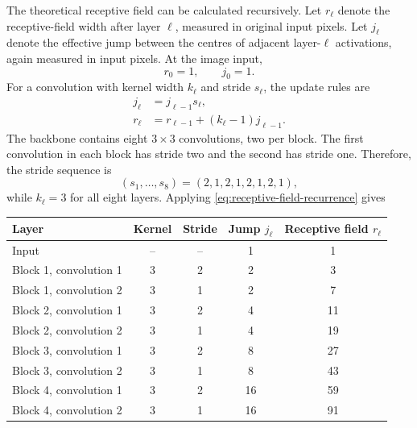 \documentclass[11pt,a4paper]{article}
\begin{document}
The theoretical receptive field can be calculated recursively. Let $r_\ell$ denote the receptive-field width after layer $\ell$, measured in original input pixels. Let $j_\ell$ denote the effective jump between the centres of adjacent layer-$\ell$ activations, again measured in input pixels. At the image input, 
\begin{equation} 
	r_0=1, \qquad j_0=1. 
\end{equation} 
For a convolution with kernel width $k_\ell$ and stride $s_\ell$, the update rules are 
\begin{align} 
	j_\ell &= j_{\ell-1}s_\ell, \\ 
	r_\ell &= r_{\ell-1} + (k_\ell-1)j_{\ell-1}. \label{eq:receptive-field-recurrence} 
\end{align} 
The backbone contains eight $3\times3$ convolutions, two per block. The first convolution in each block has stride two and the second has stride one. Therefore, the stride sequence is 
\begin{equation} 
	(s_1,\ldots,s_8) = (2,1,2,1,2,1,2,1), 
\end{equation} while $k_\ell=3$ for all eight layers. Applying \eqref{eq:receptive-field-recurrence} gives 
\begin{center} 
	\begin{tabular}{lcccc} 
		\toprule 
		Layer & Kernel & Stride & Jump $j_\ell$ & Receptive field $r_\ell$\\ 
		\midrule 
		Input & -- & -- & 1 & 1\\ Block 1, convolution 1 & 3 & 2 & 2 & 3\\ 
		Block 1, convolution 2 & 3 & 1 & 2 & 7\\ Block 2, convolution 1 & 3 & 2 & 4 & 11\\ 
		Block 2, convolution 2 & 3 & 1 & 4 & 19\\ Block 3, convolution 1 & 3 & 2 & 8 & 27\\ 
		Block 3, convolution 2 & 3 & 1 & 8 & 43\\ Block 4, convolution 1 & 3 & 2 & 16 & 59\\ 
		Block 4, convolution 2 & 3 & 1 & 16 & 91\\ 
		\bottomrule 
\end{tabular} 
\end{center} 
\end{document}
